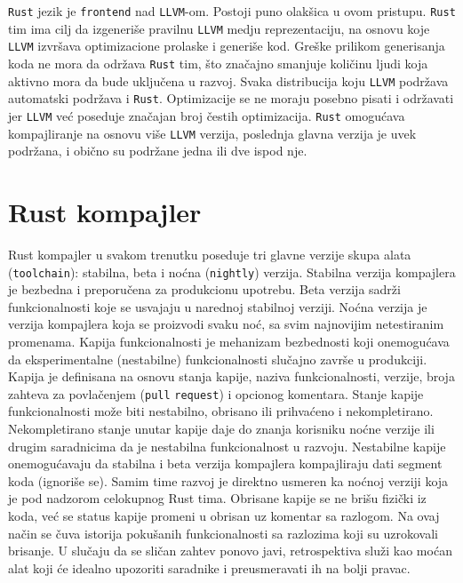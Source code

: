 \documentclass[11pt]{article}
\begin{document}
\verb|Rust| jezik je \verb|frontend| nad \verb|LLVM|-om. Postoji puno olakšica u ovom pristupu.
\verb|Rust| tim ima cilj da izgeneriše pravilnu \verb|LLVM| medju reprezentaciju, na osnovu koje 
\verb|LLVM| izvršava optimizacione prolaske i generiše kod. Greške prilikom generisanja koda ne mora da 
održava \verb|Rust| tim, što značajno smanjuje količinu ljudi koja aktivno mora da bude uključena u razvoj. 
Svaka distribucija koju \verb|LLVM| podržava automatski podržava i \verb|Rust|. Optimizacije se ne moraju 
posebno pisati i održavati jer \verb|LLVM| već poseduje značajan broj čestih optimizacija. \verb|Rust| 
omogućava kompajliranje na osnovu više \verb|LLVM| verzija, poslednja glavna verzija je uvek podržana,
i obično su podržane jedna ili dve ispod nje.



\newpage
\section{Rust kompajler}

Rust kompajler u svakom trenutku poseduje tri glavne verzije skupa alata (\verb|toolchain|): stabilna, beta i noćna (\verb|nightly|) verzija.
Stabilna verzija kompajlera je bezbedna i preporučena za produkcionu upotrebu. Beta verzija sadrži funkcionalnosti
koje se usvajaju u narednoj stabilnoj verziji. Noćna verzija je verzija kompajlera koja se 
proizvodi svaku noć, sa svim najnovijim netestiranim promenama. Kapija funkcionalnosti je mehanizam bezbednosti
koji onemogućava da eksperimentalne (nestabilne) funkcionalnosti slučajno završe u produkciji. 
Kapija je definisana na osnovu stanja kapije, naziva funkcionalnosti, verzije, broja zahteva za povlačenjem
(\verb|pull| \verb|request|) i opcionog komentara.
Stanje kapije funkcionalnosti može biti nestabilno, obrisano ili prihvaćeno i nekompletirano. Nekompletirano 
stanje unutar kapije daje do znanja korisniku noćne verzije ili drugim saradnicima da je nestabilna funkcionalnost 
u razvoju.  Nestabilne kapije onemogućavaju da stabilna i beta verzija kompajlera kompajliraju 
dati segment koda (ignoriše se).  Samim time razvoj je direktno 
usmeren ka noćnoj verziji koja je pod nadzorom celokupnog Rust tima. Obrisane kapije se ne brišu fizički iz koda,
već se status kapije promeni u obrisan uz komentar sa razlogom. Na ovaj način se čuva istorija pokušanih 
funkcionalnosti sa razlozima koji su uzrokovali brisanje. U slučaju da se sličan zahtev ponovo javi, retrospektiva
služi kao moćan alat koji će idealno upozoriti saradnike i preusmeravati ih na bolji pravac.
\end{document}
